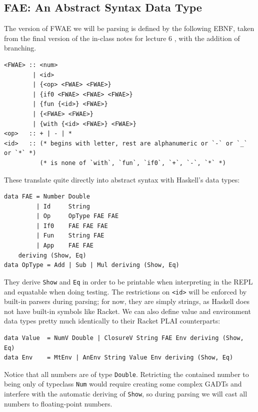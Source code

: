 \documentclass[format=acmlarge, review=false, nonacm=false, screen=true]{acmart}
\begin{document}
\subsection{FAE: An Abstract Syntax Data Type}
The version of FWAE we will be parsing is defined by the following EBNF, taken from the final version of the in-class notes for lecture 6 \cite{inclass6}, with the addition of branching.
\begin{verbatim}
<FWAE> :: <num>
        | <id>
        | {<op> <FWAE> <FWAE>}
        | {if0 <FWAE> <FWAE> <FWAE>}
        | {fun {<id>} <FWAE>}
        | {<FWAE> <FWAE>}
        | {with {<id> <FWAE>} <FWAE>}
<op>   :: + | - | *
<id>   :: (* begins with letter, rest are alphanumeric or `-` or `_` or `*` *)
          (* is none of `with`, `fun`, `if0`, `+`, `-`, `*` *)
\end{verbatim}
These translate quite directly into abstract syntax with Haskell's data types:
\begin{verbatim}
data FAE = Number Double
         | Id     String
         | Op     OpType FAE FAE
         | If0    FAE FAE FAE
         | Fun    String FAE
         | App    FAE FAE
    deriving (Show, Eq)
data OpType = Add | Sub | Mul deriving (Show, Eq)
\end{verbatim}
They derive \texttt{Show} and \texttt{Eq} in order to be printable when interpreting in the REPL and equatable when doing testing. The restrictions on \texttt{<id>} will be enforced by built-in parsers during parsing; for now, they are simply strings, as Haskell does not have built-in symbols like Racket.
We can also define value and environment data types pretty much identically to their Racket PLAI counterparts:
\begin{verbatim}
data Value  = NumV Double | ClosureV String FAE Env deriving (Show, Eq)
data Env    = MtEnv | AnEnv String Value Env deriving (Show, Eq)
\end{verbatim}
Notice that all numbers are of type \texttt{Double}. Retricting the contained number to being only of typeclass \texttt{Num} would require creating some complex GADTs and interfere with the automatic deriving of \texttt{Show}, so during parsing we will cast all numbers to floating-point numbers.
\end{document}
